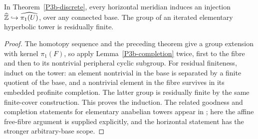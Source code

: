 \begin{corollary}\label{P3b-horizontal-profinite}
In Theorem~\ref{P3b-discrete}, every horizontal meridian induces
an injection $\widehat{\mathbb Z}\hookrightarrow\widehat{\pi _1(U)}$,
over any connected base. The group of an iterated elementary
hyperbolic tower is residually finite.
\end{corollary}
\begin{proof}
The homotopy sequence and the preceding theorem give a group
extension with kernel $\pi _1(F)$, so apply
Lemma~\ref{P3b-completion} twice, first to the fibre and then to
its nontrivial peripheral cyclic subgroup. For residual
finiteness, induct on the tower: an element nontrivial in the
base is separated by a finite quotient of the base, and a
nontrivial element in the fibre survives in its embedded
profinite completion. The latter group is residually finite
by the same finite-cover construction. This proves the induction.
The related goodness and completion statements for elementary
anabelian towers appear in
\citet[Lemmas 10.9 and 10.11]{Bresciani2021}; here the affine
free-fibre argument is supplied explicitly, and the horizontal
statement has the stronger arbitrary-base scope.
\end{proof}

